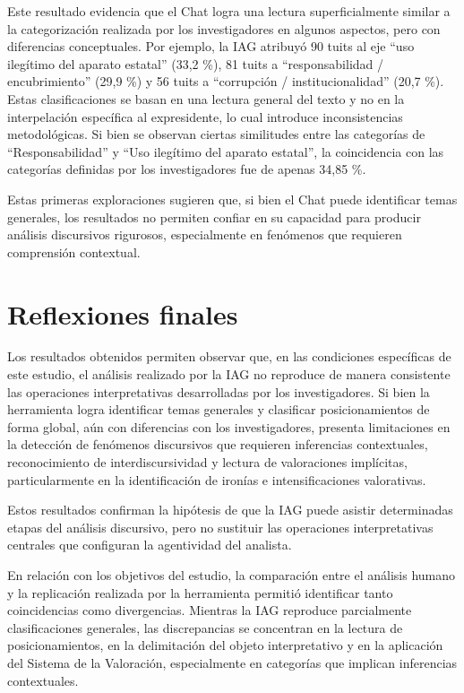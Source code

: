 \documentclass[spanish]{textolivre}
\begin{document}
Este resultado evidencia que el Chat logra una lectura superficialmente similar a la categorización realizada por los investigadores en algunos aspectos, pero con diferencias conceptuales. Por ejemplo, la IAG atribuyó 90 tuits al eje “uso ilegítimo del aparato estatal” (33,2 \%), 81 tuits a “responsabilidad / encubrimiento” (29,9 \%) y 56 tuits a “corrupción / institucionalidad” (20,7 \%). Estas clasificaciones se basan en una lectura general del texto y no en la interpelación específica al expresidente, lo cual introduce inconsistencias metodológicas. Si bien se observan ciertas similitudes entre las categorías de “Responsabilidad” y “Uso ilegítimo del aparato estatal”, la coincidencia con las categorías definidas por los investigadores fue de apenas 34,85 \%.

Estas primeras exploraciones sugieren que, si bien el Chat puede identificar temas generales, los resultados no permiten confiar en su capacidad para producir análisis discursivos rigurosos, especialmente en fenómenos que requieren comprensión contextual.



\section{Reflexiones finales}\label{sec-conclusao}
Los resultados obtenidos permiten observar que, en las condiciones específicas de este estudio, el análisis realizado por la IAG no reproduce de manera consistente las operaciones interpretativas desarrolladas por los investigadores. Si bien la herramienta logra identificar temas generales y clasificar posicionamientos de forma global, aún con diferencias con los investigadores, presenta limitaciones en la detección de fenómenos discursivos que requieren inferencias contextuales, reconocimiento de interdiscursividad y lectura de valoraciones implícitas, particularmente en la identificación de ironías e intensificaciones valorativas.

Estos resultados confirman la hipótesis de que la IAG puede asistir determinadas etapas del análisis discursivo, pero no sustituir las operaciones interpretativas centrales que configuran la agentividad del analista.

En relación con los objetivos del estudio, la comparación entre el análisis humano y la replicación realizada por la herramienta permitió identificar tanto coincidencias como divergencias. Mientras la IAG reproduce parcialmente clasificaciones generales, las discrepancias se concentran en la lectura de posicionamientos, en la delimitación del objeto interpretativo y en la aplicación del Sistema de la Valoración, especialmente en categorías que implican inferencias contextuales.
\end{document}
